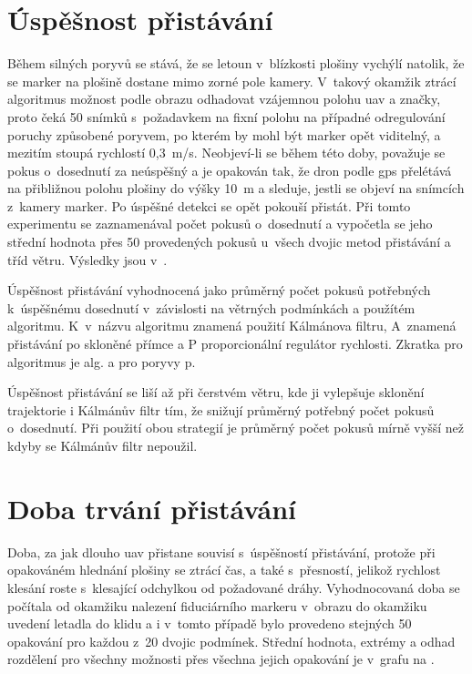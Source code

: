   \section{Úspěšnost přistávání} \label{sec:uspesnost}
    Během silných poryvů se stává, že se letoun v~blízkosti plošiny vychýlí natolik, že se marker na plošině dostane mimo zorné pole kamery. V~takový okamžik ztrácí algoritmus možnost podle obrazu odhadovat vzájemnou polohu \acrshort{uav} a značky, proto čeká 50 snímků s~požadavkem na fixní polohu na případné odregulování poruchy způsobené poryvem, po kterém by mohl být marker opět viditelný, a mezitím stoupá rychlostí 0{,}3~m/s. {Neobjeví-li} se během této doby, považuje se pokus o~dosednutí za neúspěšný a je opakován tak, že dron podle \acrshort{gps} přelétává na přibližnou polohu plošiny do výšky 10~m a sleduje, jestli se objeví na snímcích z~kamery marker. Po úspěšné detekci se opět pokouší přistát. Při tomto experimentu se zaznamenával počet pokusů o~dosednutí a vypočetla se jeho střední hodnota přes 50 provedených pokusů u~všech dvojic metod přistávání a tříd větru. Výsledky jsou v~.

    \begin{table}[H]
      \centering
      
      \caption[Úspěšnost přistávání]{Úspěšnost přistávání vyhodnocená jako průměrný počet pokusů potřebných k~úspěšnému dosednutí v~závislosti na větrných podmínkách a použítém algoritmu. K~v~názvu algoritmu znamená použití Kálmánova filtru, A~znamená přistávání po skloněné přímce a P proporcionální regulátor rychlosti. Zkratka pro algoritmus je alg. a pro poryvy p.}
      \label{tab:uspesnost}
    \end{table}

    Úspěšnost přistávání se liší až při čerstvém větru, kde ji vylepšuje sklonění trajektorie i Kálmánův filtr tím, že snižují průměrný potřebný počet pokusů o~dosednutí. Při použití obou strategií je průměrný počet pokusů mírně vyšší než kdyby se Kálmánův filtr nepoužil.

  \section{Doba trvání přistávání}
    Doba, za jak dlouho \acrshort{uav} přistane souvisí s~úspěšností přistávání, protože při opakováném hlednání plošiny se ztrácí čas, a také s~přesností, jelikož rychlost klesání roste s~klesající odchylkou od požadované dráhy. Vyhodnocovaná doba se počítala od okamžiku nalezení fiduciárního markeru v~obrazu do okamžiku uvedení letadla do klidu a i v~tomto případě bylo provedeno stejných 50 opakování pro každou z~20 dvojic podmínek. Střední hodnota, extrémy a odhad rozdělení pro všechny možnosti přes všechna jejich opakování je v~grafu na .

